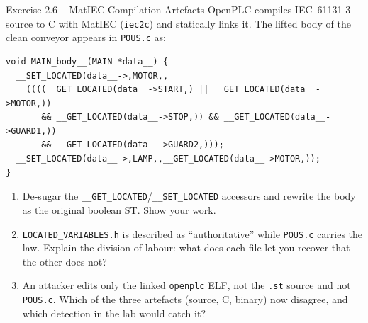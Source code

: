 \documentclass[11pt,a4paper]{article}
\begin{document}
\begin{taskbox}{Exercise 2.6 -- MatIEC Compilation Artefacts}
OpenPLC compiles IEC~61131-3 source to C with MatIEC (\texttt{iec2c}) and statically links it.
The lifted body of the clean conveyor appears in \texttt{POUS.c} as:
\begin{lstlisting}
void MAIN_body__(MAIN *data__) {
  __SET_LOCATED(data__->,MOTOR,,
    ((((__GET_LOCATED(data__->START,) || __GET_LOCATED(data__->MOTOR,))
       && __GET_LOCATED(data__->STOP,)) && __GET_LOCATED(data__->GUARD1,))
       && __GET_LOCATED(data__->GUARD2,)));
  __SET_LOCATED(data__->,LAMP,,__GET_LOCATED(data__->MOTOR,));
}
\end{lstlisting}
\begin{enumerate}\setlength{\itemsep}{0pt}
  \item De-sugar the \texttt{\_\_GET\_LOCATED}/\texttt{\_\_SET\_LOCATED} accessors and rewrite the
        body as the original boolean ST. Show your work.
  \item \texttt{LOCATED\_VARIABLES.h} is described as ``authoritative'' while \texttt{POUS.c}
        carries the law. Explain the division of labour: what does each file let you recover that
        the other does not?
  \item An attacker edits only the linked \texttt{openplc} ELF, not the \texttt{.st} source and
        not \texttt{POUS.c}. Which of the three artefacts (source, C, binary) now disagree, and
        which detection in the lab would catch it?
\end{enumerate}
\end{taskbox}
\end{document}
